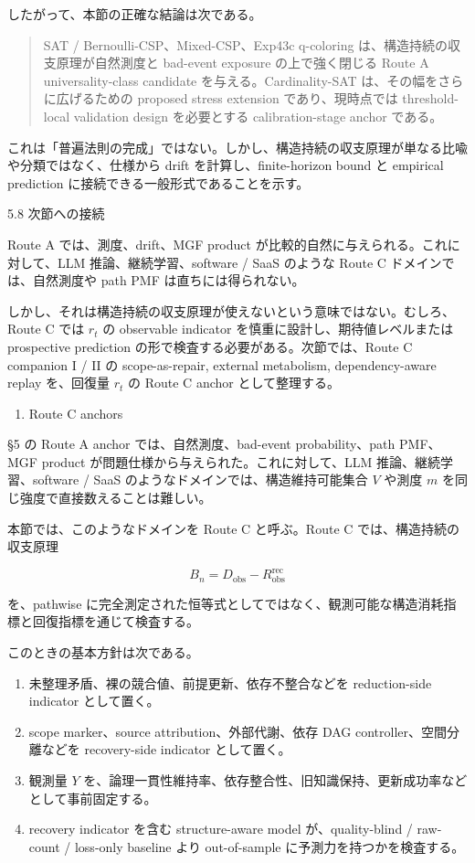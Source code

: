 \documentclass[12pt,a4paper]{article}
\begin{document}
したがって、本節の正確な結論は次である。

\begin{quote}
SAT / Bernoulli-CSP、Mixed-CSP、Exp43c q-coloring は、構造持続の収支原理が自然測度と bad-event exposure の上で強く閉じる Route A universality-class candidate を与える。Cardinality-SAT は、その幅をさらに広げるための proposed stress extension であり、現時点では threshold-local validation design を必要とする calibration-stage anchor である。
\end{quote}

これは「普遍法則の完成」ではない。しかし、構造持続の収支原理が単なる比喩や分類ではなく、仕様から drift を計算し、finite-horizon bound と empirical prediction に接続できる一般形式であることを示す。

5.8 次節への接続

Route A では、測度、drift、MGF product が比較的自然に与えられる。これに対して、LLM 推論、継続学習、software / SaaS のような Route C ドメインでは、自然測度や path PMF は直ちには得られない。

しかし、それは構造持続の収支原理が使えないという意味ではない。むしろ、Route C では \(r_{t}\) の observable indicator を慎重に設計し、期待値レベルまたは prospective prediction の形で検査する必要がある。次節では、Route C companion I / II の scope-as-repair, external metabolism, dependency-aware replay を、回復量 \(r_{t}\) の Route C anchor として整理する。

\begin{enumerate}
\def\labelenumi{\arabic{enumi}.}
\setcounter{enumi}{5}
\tightlist
\item
  Route C anchors
\end{enumerate}

§5 の Route A anchor では、自然測度、bad-event probability、path PMF、MGF product が問題仕様から与えられた。これに対して、LLM 推論、継続学習、software / SaaS のようなドメインでは、構造維持可能集合 \(V\) や測度 \(m\) を同じ強度で直接数えることは難しい。

本節では、このようなドメインを Route C と呼ぶ。Route C では、構造持続の収支原理

\[
B_{n}=D_{\mathrm{obs}}-R_{\mathrm{obs}}^{\mathrm{rec}}
\]

を、pathwise に完全測定された恒等式としてではなく、観測可能な構造消耗指標と回復指標を通じて検査する。

このときの基本方針は次である。

\begin{enumerate}
\def\labelenumi{\arabic{enumi}.}
\tightlist
\item
  未整理矛盾、裸の競合値、前提更新、依存不整合などを reduction-side indicator として置く。
\item
  scope marker、source attribution、外部代謝、依存 DAG controller、空間分離などを recovery-side indicator として置く。
\item
  観測量 \(Y\) を、論理一貫性維持率、依存整合性、旧知識保持、更新成功率などとして事前固定する。
\item
  recovery indicator を含む structure-aware model が、quality-blind / raw-count / loss-only baseline より out-of-sample に予測力を持つかを検査する。
\end{enumerate}
\end{document}
